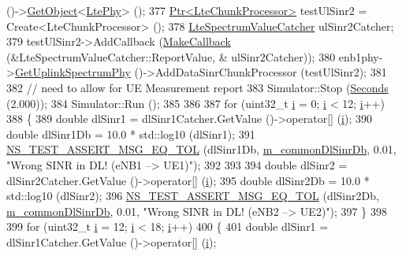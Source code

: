 \begin{DoxyCode}
       ()->\hyperlink{classns3_1_1Object_a13e18c00017096c8381eb651d5bd0783}{GetObject}<\hyperlink{classns3_1_1LtePhy}{LtePhy}> ();
377   \hyperlink{classns3_1_1Ptr}{Ptr<LteChunkProcessor>} testUlSinr2 = Create<LteChunkProcessor> ();
378   \hyperlink{classns3_1_1LteSpectrumValueCatcher}{LteSpectrumValueCatcher} ulSinr2Catcher;
379   testUlSinr2->AddCallback (\hyperlink{group__makecallbackmemptr_ga9376283685aa99d204048d6a4b7610a4}{MakeCallback} (&LteSpectrumValueCatcher::ReportValue, &
      ulSinr2Catcher));
380   enb1phy->\hyperlink{classns3_1_1LtePhy_aa17612c41d80653ed556431eedef4304}{GetUplinkSpectrumPhy} ()->AddDataSinrChunkProcessor (testUlSinr2);
381 
382 \textcolor{comment}{// need to allow for UE Measurement report}
383   Simulator::Stop (\hyperlink{group__timecivil_ga33c34b816f8ff6628e33d5c8e9713b9e}{Seconds} (2.000));
384   Simulator::Run ();
385 
386 
387   \textcolor{keywordflow}{for} (uint32\_t \hyperlink{bernuolliDistribution_8m_a6f6ccfcf58b31cb6412107d9d5281426}{i} = 0; \hyperlink{bernuolliDistribution_8m_a6f6ccfcf58b31cb6412107d9d5281426}{i} < 12; \hyperlink{bernuolliDistribution_8m_a6f6ccfcf58b31cb6412107d9d5281426}{i}++)
388     \{
389       \textcolor{keywordtype}{double} dlSinr1 = dlSinr1Catcher.GetValue ()->operator[] (\hyperlink{bernuolliDistribution_8m_a6f6ccfcf58b31cb6412107d9d5281426}{i});
390       \textcolor{keywordtype}{double} dlSinr1Db = 10.0 * std::log10 (dlSinr1);
391       \hyperlink{group__testing_ga9e7861b56b4e70db3b56044cb7a28e41}{NS\_TEST\_ASSERT\_MSG\_EQ\_TOL} (dlSinr1Db, 
      \hyperlink{classLteInterferenceStrictFrTestCase_a2f4263af737109fdd03c694bec8c9a4a}{m\_commonDlSinrDb}, 0.01, \textcolor{stringliteral}{"Wrong SINR in DL! (eNB1 --> UE1)"});
392 
393 
394       \textcolor{keywordtype}{double} dlSinr2 = dlSinr2Catcher.GetValue ()->operator[] (\hyperlink{bernuolliDistribution_8m_a6f6ccfcf58b31cb6412107d9d5281426}{i});
395       \textcolor{keywordtype}{double} dlSinr2Db = 10.0 * std::log10 (dlSinr2);
396       \hyperlink{group__testing_ga9e7861b56b4e70db3b56044cb7a28e41}{NS\_TEST\_ASSERT\_MSG\_EQ\_TOL} (dlSinr2Db, 
      \hyperlink{classLteInterferenceStrictFrTestCase_a2f4263af737109fdd03c694bec8c9a4a}{m\_commonDlSinrDb}, 0.01, \textcolor{stringliteral}{"Wrong SINR in DL! (eNB2 --> UE2)"});
397     \}
398 
399   \textcolor{keywordflow}{for} (uint32\_t \hyperlink{bernuolliDistribution_8m_a6f6ccfcf58b31cb6412107d9d5281426}{i} = 12; \hyperlink{bernuolliDistribution_8m_a6f6ccfcf58b31cb6412107d9d5281426}{i} < 18; \hyperlink{bernuolliDistribution_8m_a6f6ccfcf58b31cb6412107d9d5281426}{i}++)
400     \{
401       \textcolor{keywordtype}{double} dlSinr1 = dlSinr1Catcher.GetValue ()->operator[] (\hyperlink{bernuolliDistribution_8m_a6f6ccfcf58b31cb6412107d9d5281426}{i});

\end{DoxyCode}

